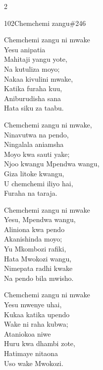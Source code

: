 \begin{multicols}{2}
\begin{hymn}{102}{Chemchemi zangu}{\#246}
\begin{stanza}
Chemchemi zangu ni mwake\\
Yesu anipatia\\
Mahitaji yangu yote,\\
Na kutuliza moyo;\\
Nakaa kivulini mwake,\\
Katika furaha kuu,\\
Aniburudisha sana\\
Hata siku za taabu.
\end{stanza}
\begin{stanza}
Chemchemi zangu ni mwake,\\
Ninavutwa na pendo,\\
Ningalala aniamsha\\
Moyo kwa sauti yake;\\
Njoo kwangu Mpendwa wangu,\\
Giza litoke kwangu,\\
U chemchemi iliyo hai,\\
Furaha na taraja.
\end{stanza}
\begin{stanza}
Chemchemi zangu ni mwake\\
Yesu, Mpendwa wangu,\\
Aliniona kwa pendo\\
Akanishinda moyo;\\
Yu Mkombozi rafiki,\\
Hata Mwokozi wangu,\\
Nimepata radhi kwake\\
Na pendo bila mwisho.
\end{stanza}
\begin{stanza}
Chemchemi zangu ni mwake\\
Yesu mwenye uhai,\\
Kukaa katika upendo\\
Wake ni raha kubwa;\\
Ataniokoa niwe\\
Huru kwa dhambi zote,\\
Hatimaye nitaona\\
Uso wake Mwokozi.
\end{stanza}
\end{hymn}


\end{multicols}
